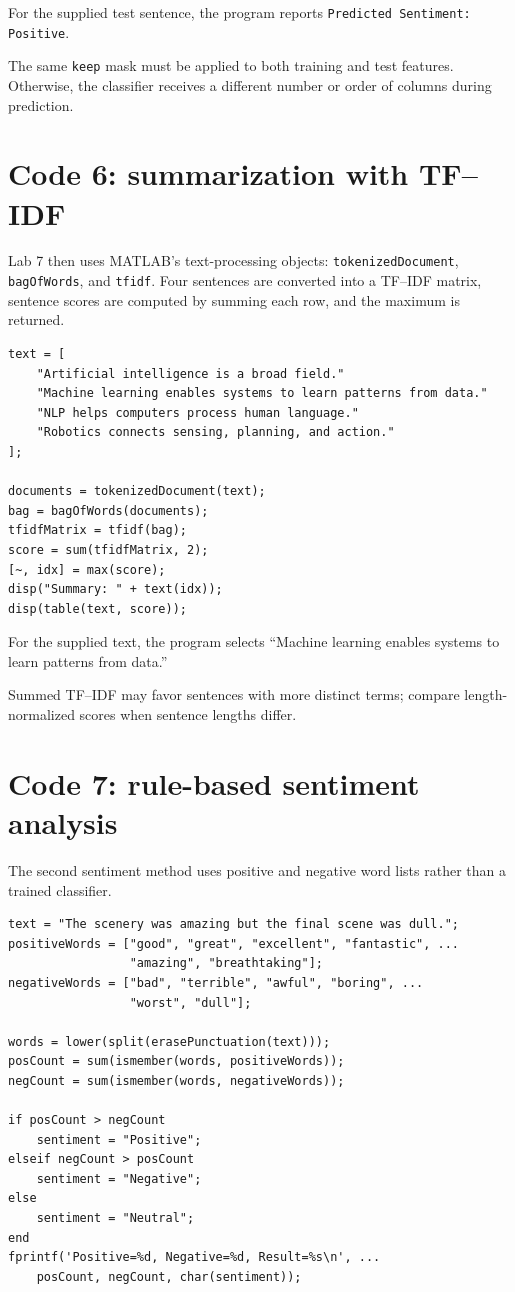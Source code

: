 For the supplied test sentence, the program reports \texttt{Predicted Sentiment: Positive}.

The same \texttt{keep} mask must be applied to both training and test features. Otherwise, the classifier receives a different number or order of columns during prediction.

\section{Code 6: summarization with TF--IDF}

Lab 7 then uses MATLAB's text-processing objects: \texttt{tokenizedDocument}, \texttt{bagOfWords}, and \texttt{tfidf}. Four sentences are converted into a TF--IDF matrix, sentence scores are computed by summing each row, and the maximum is returned.

\begin{lstlisting}[style=mlmatlab]
text = [
    "Artificial intelligence is a broad field."
    "Machine learning enables systems to learn patterns from data."
    "NLP helps computers process human language."
    "Robotics connects sensing, planning, and action."
];

documents = tokenizedDocument(text);
bag = bagOfWords(documents);
tfidfMatrix = tfidf(bag);
score = sum(tfidfMatrix, 2);
[~, idx] = max(score);
disp("Summary: " + text(idx));
disp(table(text, score));
\end{lstlisting}

For the supplied text, the program selects ``Machine learning enables systems to learn patterns from data.''

Summed TF--IDF may favor sentences with more distinct terms; compare length-normalized scores when sentence lengths differ.

\section{Code 7: rule-based sentiment analysis}

The second sentiment method uses positive and negative word lists rather than a trained classifier.

\begin{lstlisting}[style=mlmatlab]
text = "The scenery was amazing but the final scene was dull.";
positiveWords = ["good", "great", "excellent", "fantastic", ...
                 "amazing", "breathtaking"];
negativeWords = ["bad", "terrible", "awful", "boring", ...
                 "worst", "dull"];

words = lower(split(erasePunctuation(text)));
posCount = sum(ismember(words, positiveWords));
negCount = sum(ismember(words, negativeWords));

if posCount > negCount
    sentiment = "Positive";
elseif negCount > posCount
    sentiment = "Negative";
else
    sentiment = "Neutral";
end
fprintf('Positive=%d, Negative=%d, Result=%s\n', ...
    posCount, negCount, char(sentiment));
\end{lstlisting}

